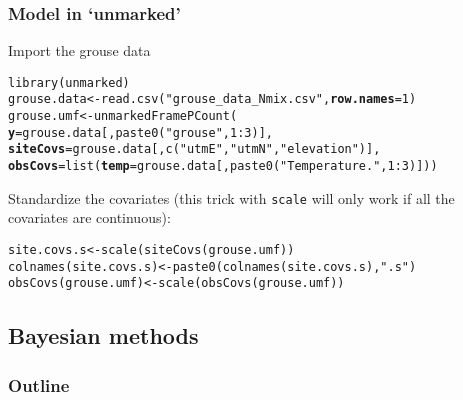 \documentclass[color=usenames,dvipsnames]{beamer}\usepackage[]{graphicx}\usepackage[]{color}
\makeatletter
\newcommand{\hlnum}[1]{\textcolor[rgb]{0.69,0.494,0}{#1}}%
\newcommand{\hlstr}[1]{\textcolor[rgb]{0.749,0.012,0.012}{#1}}%
\newcommand{\hlopt}[1]{\textcolor[rgb]{0,0,0}{#1}}%
\newcommand{\hlstd}[1]{\textcolor[rgb]{0,0,0}{#1}}%
\newcommand{\hlkwb}[1]{\textcolor[rgb]{0,0.341,0.682}{#1}}%
\newcommand{\hlkwc}[1]{\textcolor[rgb]{0,0,0}{\textbf{#1}}}%
\newcommand{\hlkwd}[1]{\textcolor[rgb]{0.004,0.004,0.506}{#1}}%
\newenvironment{kframe}{%
 \def\at@end@of@kframe{}%
 \ifinner\ifhmode%
  \def\at@end@of@kframe{\end{minipage}}%
  \begin{minipage}{\columnwidth}%
 \fi\fi%
 \def\FrameCommand##1{\hskip\@totalleftmargin \hskip-\fboxsep
 \colorbox{shadecolor}{##1}\hskip-\fboxsep
     \hskip-\linewidth \hskip-\@totalleftmargin \hskip\columnwidth}%
 \MakeFramed {\advance\hsize-\width
   \@totalleftmargin\z@ \linewidth\hsize
   \@setminipage}}%
 {\par\unskip\endMakeFramed%
 \at@end@of@kframe}
\newenvironment{knitrout}{}{} %
\newcommand{\inr}[1]{\colorbox{inlinecolor}{\texttt{#1}}}
\makeatother
\begin{document}
\begin{frame}[fragile]
  \frametitle{Model in `unmarked'}
  \small
  Import the grouse data
\begin{knitrout}
\color{fgcolor}\begin{kframe}
\begin{alltt}
\hlkwd{library}\hlstd{(unmarked)}
\hlstd{grouse.data} \hlkwb{<-} \hlkwd{read.csv}\hlstd{(}\hlstr{"grouse_data_Nmix.csv"}\hlstd{,} \hlkwc{row.names}\hlstd{=}\hlnum{1}\hlstd{)}
\hlstd{grouse.umf} \hlkwb{<-} \hlkwd{unmarkedFramePCount}\hlstd{(}
    \hlkwc{y}\hlstd{=grouse.data[,}\hlkwd{paste0}\hlstd{(}\hlstr{"grouse"}\hlstd{,}\hlnum{1}\hlopt{:}\hlnum{3}\hlstd{)],}
    \hlkwc{siteCovs}\hlstd{=grouse.data[,}\hlkwd{c}\hlstd{(}\hlstr{"utmE"}\hlstd{,}\hlstr{"utmN"}\hlstd{,}\hlstr{"elevation"}\hlstd{)],}
    \hlkwc{obsCovs}\hlstd{=}\hlkwd{list}\hlstd{(}\hlkwc{temp}\hlstd{=grouse.data[,}\hlkwd{paste0}\hlstd{(}\hlstr{"Temperature."}\hlstd{,}\hlnum{1}\hlopt{:}\hlnum{3}\hlstd{)]))}
\end{alltt}
\end{kframe}
\end{knitrout}
\pause
\vfill
Standardize the covariates (this trick with \inr{scale} will only work
if all the covariates are continuous):
\begin{knitrout}
\color{fgcolor}\begin{kframe}
\begin{alltt}
\hlstd{site.covs.s} \hlkwb{<-} \hlkwd{scale}\hlstd{(}\hlkwd{siteCovs}\hlstd{(grouse.umf))}
\hlkwd{colnames}\hlstd{(site.covs.s)} \hlkwb{<-} \hlkwd{paste0}\hlstd{(}\hlkwd{colnames}\hlstd{(site.covs.s),} \hlstr{".s"}\hlstd{)}
\hlkwd{obsCovs}\hlstd{(grouse.umf)} \hlkwb{<-} \hlkwd{scale}\hlstd{(}\hlkwd{obsCovs}\hlstd{(grouse.umf))}
\end{alltt}
\end{kframe}
\end{knitrout}
\end{frame}




\subsection{Bayesian methods}



\begin{frame}
  \frametitle{Outline}
  \Large
\end{frame}
\end{document}
